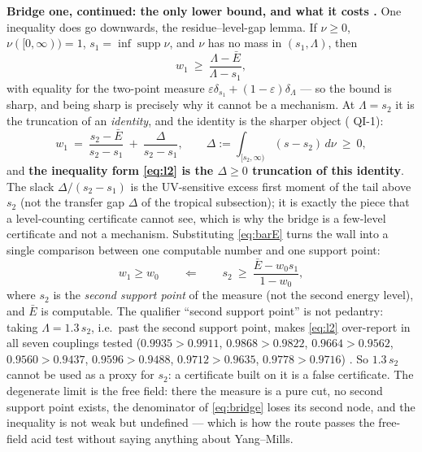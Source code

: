 \textbf{Bridge one, continued: the only lower bound, and what it costs \LT.} One inequality does go
downwards, the residue--level-gap lemma. If $\nu\ge0$, $\nu([0,\infty))=1$, $s_1=\inf\operatorname{supp}\nu$,
and $\nu$ has no mass in $(s_1,\Lambda)$, then
\begin{equation}
  w_1\ \ge\ \frac{\Lambda-\bar E}{\Lambda-s_1},
  \label{eq:l2}
\end{equation}
with equality for the two-point measure $\varepsilon\delta_{s_1}+(1-\varepsilon)\delta_\Lambda$ ---
so the bound is sharp, and being sharp is precisely why it cannot be a mechanism. At $\Lambda=s_2$
it is the truncation of an \emph{identity}, and the identity is the sharper object
( QI-1):
\begin{equation}
  w_1\ =\ \frac{s_2-\bar E}{s_2-s_1}\ +\ \frac{\Delta}{s_2-s_1},
  \qquad
  \Delta:=\int_{[s_2,\infty)}(s-s_2)\,d\nu\ \ge\ 0 ,
\end{equation}
and \textbf{the inequality form \eqref{eq:l2} is the $\Delta\ge0$ truncation of this identity}. The
slack $\Delta/(s_2-s_1)$ is the UV-sensitive excess first moment of the tail above $s_2$
(not the transfer gap $\Delta$ of the tropical subsection); it is exactly the piece that a
level-counting certificate cannot see, which is why the bridge is a few-level certificate and not a
mechanism. Substituting
\eqref{eq:barE} turns the wall into a single comparison between one computable number and one
support point:
\begin{equation}
  w_1\ge w_0
  \qquad\Longleftarrow\qquad
  s_2\ \ge\ \frac{\bar E-w_0s_1}{1-w_0},
  \label{eq:bridge}
\end{equation}
where $s_2$ is the \emph{second support point} of the measure (not the second energy level), and
$\bar E$ is computable. The qualifier ``second support point'' is not pedantry: taking
$\Lambda=1.3\,s_2$, i.e.\ past the second support point, makes \eqref{eq:l2} over-report in all
seven couplings tested ($0.9935>0.9911$, $0.9868>0.9822$, $0.9664>0.9562$, $0.9560>0.9437$,
$0.9596>0.9488$, $0.9712>0.9635$, $0.9778>0.9716$) \LE. So $1.3\,s_2$ cannot be used as a proxy for
$s_2$: a certificate built on it is a false certificate. The degenerate limit is the free field:
there the measure is a pure cut, no second support point exists, the denominator of
\eqref{eq:bridge} loses its second node, and the inequality is not weak but undefined --- which is
how the route passes the free-field acid test without saying anything about Yang--Mills.


